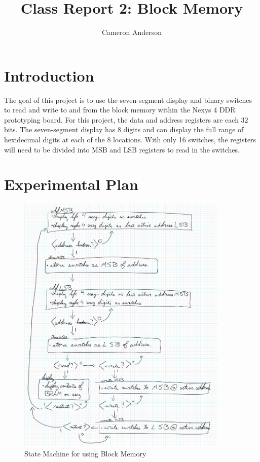 \documentclass{article}
\author{Cameron Anderson}
\title{Class Report 2: Block Memory}
\begin{document}
\maketitle

\section{Introduction}
The goal of this project is to use the seven-segment display and binary switches to read and write to and from the block memory within the Nexys 4 DDR prototyping board. For this project, the data and address registers are each 32 bits. The seven-segment display has 8 digits and can display the full range of hexidecimal digits at each of the 8 locations. With only 16 switches, the registers will need to be divided into MSB and LSB registers to read in the switches.

\section{Experimental Plan}
\begin{figure}
\begin{center}
\caption{State Machine for using Block Memory}\label{fig:blockmemstatemachine}
\includegraphics[width=0.9\textwidth]{blockmemstatemachine.jpg}
\end{center}
\end{figure}
     
\end{document}
